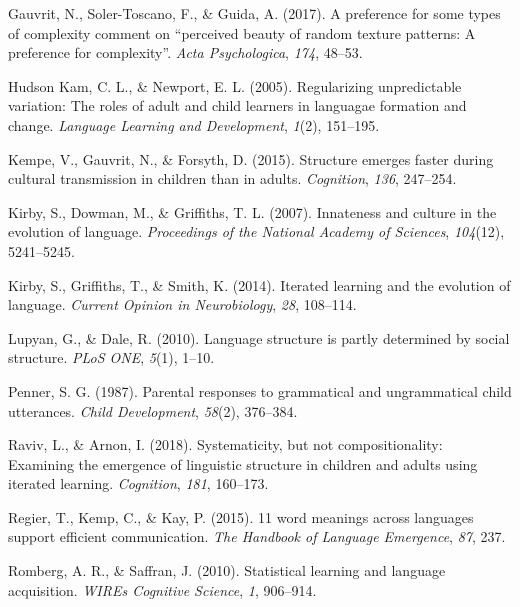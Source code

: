 \documentclass[10pt, letterpaper]{article}
\begin{document}
\leavevmode\hypertarget{ref-gauvrit-2017}{}%
Gauvrit, N., Soler-Toscano, F., \& Guida, A. (2017). A preference for
some types of complexity comment on ``perceived beauty of random texture
patterns: A preference for complexity''. \emph{Acta Psychologica},
\emph{174}, 48--53.

\leavevmode\hypertarget{ref-hudsonkam-2005}{}%
Hudson Kam, C. L., \& Newport, E. L. (2005). Regularizing unpredictable
variation: The roles of adult and child learners in languagae formation
and change. \emph{Language Learning and Development}, \emph{1}(2),
151--195.

\leavevmode\hypertarget{ref-kempe-2015}{}%
Kempe, V., Gauvrit, N., \& Forsyth, D. (2015). Structure emerges faster
during cultural transmission in children than in adults.
\emph{Cognition}, \emph{136}, 247--254.

\leavevmode\hypertarget{ref-kirby-2007}{}%
Kirby, S., Dowman, M., \& Griffiths, T. L. (2007). Innateness and
culture in the evolution of language. \emph{Proceedings of the National
Academy of Sciences}, \emph{104}(12), 5241--5245.

\leavevmode\hypertarget{ref-kirby-2014}{}%
Kirby, S., Griffiths, T., \& Smith, K. (2014). Iterated learning and the
evolution of language. \emph{Current Opinion in Neurobiology},
\emph{28}, 108--114.

\leavevmode\hypertarget{ref-lupyan-2010}{}%
Lupyan, G., \& Dale, R. (2010). Language structure is partly determined
by social structure. \emph{PLoS ONE}, \emph{5}(1), 1--10.

\leavevmode\hypertarget{ref-penner-1987}{}%
Penner, S. G. (1987). Parental responses to grammatical and
ungrammatical child utterances. \emph{Child Development}, \emph{58}(2),
376--384.

\leavevmode\hypertarget{ref-raviv-2018}{}%
Raviv, L., \& Arnon, I. (2018). Systematicity, but not compositionality:
Examining the emergence of linguistic structure in children and adults
using iterated learning. \emph{Cognition}, \emph{181}, 160--173.

\leavevmode\hypertarget{ref-regier2015}{}%
Regier, T., Kemp, C., \& Kay, P. (2015). 11 word meanings across
languages support efficient communication. \emph{The Handbook of
Language Emergence}, \emph{87}, 237.

\leavevmode\hypertarget{ref-romberg-2010}{}%
Romberg, A. R., \& Saffran, J. (2010). Statistical learning and language
acquisition. \emph{WIREs Cognitive Science}, \emph{1}, 906--914.
\end{document}
